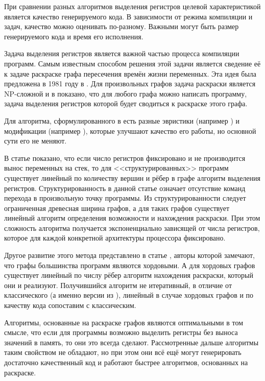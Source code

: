 \documentclass[a4paper,14pt]{extarticle}
\begin{document}
При сравнении разных алгоритмов выделения регистров целевой характеристикой является качество генерируемого кода.
В зависимости от режима компиляции и задач, качество можно оценивать по-разному.
Важными могут быть размер генерируемого кода и время его исполнения.

Задача выделения регистров является важной частью процесса компиляции программ.
Самым известным способом решения этой задачи является сведение её к задаче раскраске графа пересечения времён жизни переменных.
Эта идея была предложена в 1981 году в \cite{chaitin_register_1981}.
Для произвольных графов задача раскраски является NP-сложной и в \cite{chaitin_register_1981} показано,
что для любого графа можно написать программу, задача выделения регистров которой будет сводиться к раскраске этого графа.

Для алгоритма, сформулированного в \cite{chaitin_register_1981} есть разные эвристики (например \cite{briggs_rematerialization_1992})
и модификации (например \cite{george_iterated_1996}), которые улучшают качество его работы, но основной сути его не меняют.

В статье \cite{hans_l_bodlaender_linear-time_1997} показано, что если число регистров фиксировано и не производится вынос переменных на стек,
то для <<структурированных>> программ существует линейный по количеству вершин и рёбер в графе алгоритм выделения регистров.
Структурированность в данной статье означает отсутствие команд перехода в произвольную точку программы.
Из структурированности следует ограниченная древесная ширина графов,
а для таких графов существует линейный алгоритм определения возможности и нахождения раскраски.
При этом сложность алгоритма получается экспоненциально зависящей от числа регистров,
которое для каждой конкретной архитектуры процессора фиксировано.

Другое развитие этого метода представлено в статье \cite{hutchison_register_2005}, 
авторы которой замечают, что графы большинства программ являются хордовыми.
А для хордовых графов существует линейный по числу рёбер алгоритм нахождения раскраски, который они и реализуют. 
Получившийся алгоритм не итеративный, в отличие от классического (а именно версии из \cite{george_iterated_1996}),
линейный в случае хордовых графов и по качеству кода сопоставим с классическим.

Алгоритмы, основанные на раскраске графов являются оптимальными в том смысле,
что если для программы возможно выделить регистры без выноса значений в память, то они это всегда сделают.
Рассмотренные дальше алгоритмы таким свойством не обладают, но при этом они всё ещё могут генерировать достаточно качественный код
и работают быстрее алгоритмов, основанных на раскраске.
\end{document}
